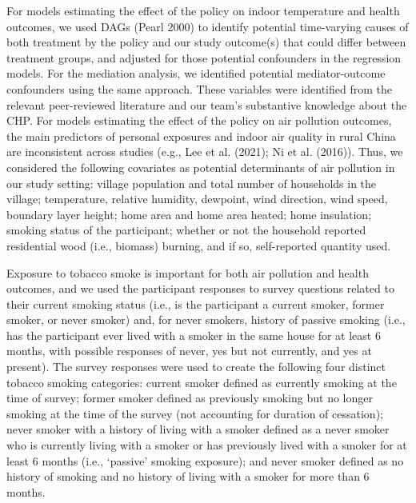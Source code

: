 \documentclass[
  letterpaper,
  DIV=11,
  numbers=noendperiod]{scrartcl}
\begin{document}
For models estimating the effect of the policy on indoor temperature and
health outcomes, we used DAGs (Pearl 2000) to identify potential
time-varying causes of both treatment by the policy and our study
outcome(s) that could differ between treatment groups, and adjusted for
those potential confounders in the regression models. For the mediation
analysis, we identified potential mediator-outcome confounders using the
same approach. These variables were identified from the relevant
peer-reviewed literature and our team's substantive knowledge about the
CHP. For models estimating the effect of the policy on air pollution
outcomes, the main predictors of personal exposures and indoor air
quality in rural China are inconsistent across studies (e.g., Lee et al.
(2021); Ni et al. (2016)). Thus, we considered the following covariates
as potential determinants of air pollution in our study setting: village
population and total number of households in the village; temperature,
relative humidity, dewpoint, wind direction, wind speed, boundary layer
height; home area and home area heated; home insulation; smoking status
of the participant; whether  or not the
household reported residential wood (i.e., biomass) burning, and if so,
self-reported quantity used.

Exposure to tobacco smoke is important for both air pollution and health
outcomes, and we used the participant responses to survey questions
related to their current smoking status (i.e., is the participant a
current smoker, former smoker, or never smoker) and, for never smokers,
history of passive smoking (i.e., has the participant ever lived with a
smoker in the same house for at least 6 months, with possible responses
of never, yes but not currently, and yes at present). The survey
responses were used to create the following four distinct tobacco
smoking categories: current smoker defined as currently smoking at the
time of survey; former smoker defined as previously smoking but no
longer smoking at the time of the survey (not accounting for duration of
cessation); never smoker with a history of living with a smoker defined
as a never smoker who is currently living with a smoker or has
previously lived with a smoker for at least 6 months (i.e., `passive'
smoking exposure); and never smoker defined as no history of smoking and
no history of living with a smoker for more than 6 months.
\end{document}
